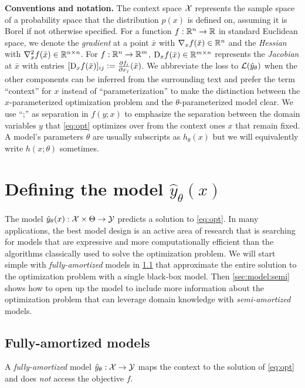 \documentclass[twoside,11pt]{article}
\begin{document}
\textbf{Conventions and notation.}
The context space ${\mathcal{X}}$ represents the
sample space of a probability space that
the distribution $p(x)$ is defined on,
assuming it is Borel if not otherwise specified.
For a function $f: \mathbb{R}^n\rightarrow\mathbb{R}$ in standard Euclidean space,
we denote the \emph{gradient} at a point $\bar x$
with $\nabla_x f(\bar x)\in \mathbb{R}^n$
and the \emph{Hessian} with $\nabla^2_x f(\bar x)\in\mathbb{R}^{n\times n}$.
For $f: \mathbb{R}^n\rightarrow\mathbb{R}^m$, $\mathrm{D}_x f(\bar x)\in\mathbb{R}^{m\times n}$
represents the \emph{Jacobian} at $\bar x$ with
entries $[\mathrm{D}_x f(\bar x)]_{ij}\vcentcolon= \frac{\partial f_i}{\partial x_j}(\bar x)$.
We abbreviate the loss to ${\mathcal{L}}(\hat y_\theta)$
when the other components can be inferred from the
surrounding text and prefer the term ``context'' for $x$ instead of
``parameterization'' to make the distinction between the
$x$-parameterized optimization problem
and the $\theta$-parameterized model clear.
We use ``;'' as separation in $f(y;x)$ to emphasize the separation
between the domain variables $y$ that \cref{eq:opt}
optimizes over from the context ones $x$ that remain fixed.
A model's parameters $\theta$ are usually subscripts
as $h_\theta(x)$ but we will equivalently write
$h(x; \theta)$ sometimes.

\section{Defining the model $\hat y_\theta(x)$}
\label{sec:model}
The model $\hat y_\theta(x): {\mathcal{X}}\times\Theta\rightarrow {\mathcal{Y}}$
predicts a solution to \cref{eq:opt}.
In many applications, the best model design is an active
area of research that is searching for models that are
expressive and more computationally efficient than the
algorithms classically used to solve the optimization problem.
We will start simple with \emph{fully-amortized} models
in \cref{sec:model:full} that approximate the entire solution
to the optimization problem with a single black-box model.
Then \cref{sec:model:semi} shows how to open up the model
to include more information about the optimization problem
that can leverage domain knowledge with \emph{semi-amortized} models.

\subsection{Fully-amortized models}
\label{sec:model:full}
\begin{definition}
  A \emph{fully-amortized} model $\hat y_\theta: {\mathcal{X}}\rightarrow{\mathcal{Y}}$
  maps the context to the solution of \cref{eq:opt}
  and does \emph{not} access the objective $f$.
\end{definition}
\end{document}
